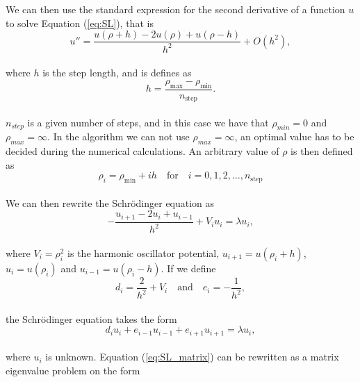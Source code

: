 \documentclass[12pt]{article}
\begin{document}
\begin{flushleft}
We can then use the standard expression for the second derivative of a function $u$ to solve Equation (\ref{eq:SL}), that is\\
\vspace{5mm} 
\begin{equation}
    u''=\frac{u(\rho+h) -2u(\rho) +u(\rho-h)}{h^2} +O(h^2),
    \label{eq:diffoperation}
\end{equation} \\
\vspace{5mm}
where $h$ is the step length, and is defines as\\
\vspace{5mm}
$$h=\frac{\rho_{\mathrm{max}}-\rho_{\mathrm{min}} }{n_{\mathrm{step}}}.$$\\
\vspace{5mm}
$n_{step}$ is a given number of steps, and in this case we have that $\rho_{min}=0$ and $\rho_{max}=\infty$. In the algorithm we can not use $\rho_{max}=\infty$, an optimal value has to be decided during the numerical calculations. An arbitrary value of $\rho$ is then defined as\\
\vspace{5mm}
$$\rho_i= \rho_{\mathrm{min}} + ih \quad\text{for}\quad i=0,1,2,\dots , n_{\mathrm{step}}$$\\
\vspace{5mm}
We can then rewrite the Schr\"odinger equation as\\
\vspace{5mm}
$$-\frac{u_{i+1} -2u_i +u_{i-1} }{h^2}+V_iu_i  = \lambda u_i,$$\\
\vspace{5mm}
where $V_i=\rho_i^2$ is the harmonic oscillator potential, $u_{i+1} = u(\rho_i + h)$, $u_{i} = u(\rho_i)$ and $u_{i-1} = u(\rho_i - h)$. If we define\\
\vspace{5mm}
$$d_i=\frac{2}{h^2}+V_i\quad\text{and}\quad e_i=-\frac{1}{h^2},$$\\
\vspace{5mm}
the Schr\"odinger equation takes the form\\
\vspace{5mm}
\begin{equation}\label{eq:SL_matrix}
d_iu_i+e_{i-1}u_{i-1}+e_{i+1}u_{i+1}  = \lambda u_i,
\end{equation}\\
\vspace{5mm}
where $u_i$ is unknown. 
\newpage
Equation (\ref{eq:SL_matrix}) can be rewritten as a matrix eigenvalue problem on the form\\

\end{flushleft}
\end{document}
